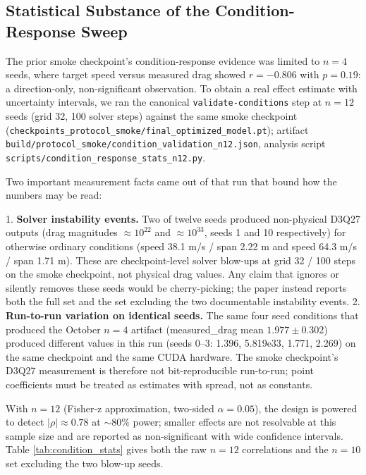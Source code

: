 \subsection{Statistical Substance of the Condition-Response Sweep}
\label{sec:condition_response_stats}
The prior smoke checkpoint's condition-response evidence was limited to \(n=4\) seeds, where target speed versus measured drag showed \(r=-0.806\) with \(p=0.19\): a direction-only, non-significant observation. To obtain a real effect estimate with uncertainty intervals, we ran the canonical \texttt{validate-conditions} step at \(n=12\) seeds (grid 32, 100 solver steps) against the same smoke checkpoint (\texttt{checkpoints\_protocol\_smoke/final\_optimized\_model.pt}); artifact \texttt{build/protocol\_smoke/condition\_validation\_n12.json}, analysis script \texttt{scripts/condition\_response\_stats\_n12.py}.

Two important measurement facts came out of that run that bound how the numbers may be read:

1. \textbf{Solver instability events.} Two of twelve seeds produced non-physical D3Q27 outputs (drag magnitudes \(\approx 10^{22}\) and \(\approx 10^{33}\), seeds 1 and 10 respectively) for otherwise ordinary conditions (speed 38.1 m/s / span 2.22 m and speed 64.3 m/s / span 1.71 m). These are checkpoint-level solver blow-ups at grid 32 / 100 steps on the smoke checkpoint, not physical drag values. Any claim that ignores or silently removes these seeds would be cherry-picking; the paper instead reports both the full set and the set excluding the two documentable instability events.
2. \textbf{Run-to-run variation on identical seeds.} The same four seed conditions that produced the October \(n=4\) artifact (measured\_drag mean \(1.977 \pm 0.302\)) produced different values in this run (seeds 0--3: 1.396, 5.819e33, 1.771, 2.269) on the same checkpoint and the same CUDA hardware. The smoke checkpoint's D3Q27 measurement is therefore not bit-reproducible run-to-run; point coefficients must be treated as estimates with spread, not as constants.

With \(n=12\) (Fisher-z approximation, two-sided \(\alpha=0.05\)), the design is powered to detect \(|\rho| \approx 0.78\) at \(\sim80\%\) power; smaller effects are not resolvable at this sample size and are reported as non-significant with wide confidence intervals. Table \ref{tab:condition_stats} gives both the raw \(n=12\) correlations and the \(n=10\) set excluding the two blow-up seeds.

